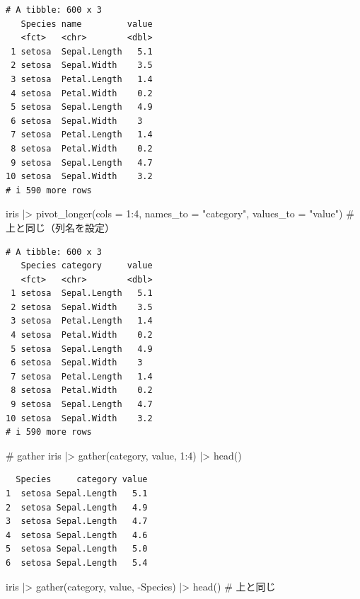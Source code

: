 \documentclass[
  letterpaper,
  DIV=11,
  numbers=noendperiod]{scrreprt}
\newenvironment{Shaded}{\begin{snugshade}}{\end{snugshade}}
\newcommand{\AttributeTok}[1]{\textcolor[rgb]{0.40,0.45,0.13}{#1}}
\newcommand{\CommentTok}[1]{\textcolor[rgb]{0.37,0.37,0.37}{#1}}
\newcommand{\DecValTok}[1]{\textcolor[rgb]{0.68,0.00,0.00}{#1}}
\newcommand{\FunctionTok}[1]{\textcolor[rgb]{0.28,0.35,0.67}{#1}}
\newcommand{\NormalTok}[1]{\textcolor[rgb]{0.00,0.23,0.31}{#1}}
\newcommand{\SpecialCharTok}[1]{\textcolor[rgb]{0.37,0.37,0.37}{#1}}
\newcommand{\StringTok}[1]{\textcolor[rgb]{0.13,0.47,0.30}{#1}}
\begin{document}
\begin{verbatim}
# A tibble: 600 x 3
   Species name         value
   <fct>   <chr>        <dbl>
 1 setosa  Sepal.Length   5.1
 2 setosa  Sepal.Width    3.5
 3 setosa  Petal.Length   1.4
 4 setosa  Petal.Width    0.2
 5 setosa  Sepal.Length   4.9
 6 setosa  Sepal.Width    3  
 7 setosa  Petal.Length   1.4
 8 setosa  Petal.Width    0.2
 9 setosa  Sepal.Length   4.7
10 setosa  Sepal.Width    3.2
# i 590 more rows
\end{verbatim}

\begin{Shaded}
\begin{Highlighting}[]
\NormalTok{iris }\SpecialCharTok{|\textgreater{}} \FunctionTok{pivot\_longer}\NormalTok{(}\AttributeTok{cols =} \DecValTok{1}\SpecialCharTok{:}\DecValTok{4}\NormalTok{, }\AttributeTok{names\_to =} \StringTok{"category"}\NormalTok{, }\AttributeTok{values\_to =} \StringTok{"value"}\NormalTok{) }\CommentTok{\# 上と同じ（列名を設定）}
\end{Highlighting}
\end{Shaded}

\begin{verbatim}
# A tibble: 600 x 3
   Species category     value
   <fct>   <chr>        <dbl>
 1 setosa  Sepal.Length   5.1
 2 setosa  Sepal.Width    3.5
 3 setosa  Petal.Length   1.4
 4 setosa  Petal.Width    0.2
 5 setosa  Sepal.Length   4.9
 6 setosa  Sepal.Width    3  
 7 setosa  Petal.Length   1.4
 8 setosa  Petal.Width    0.2
 9 setosa  Sepal.Length   4.7
10 setosa  Sepal.Width    3.2
# i 590 more rows
\end{verbatim}

\begin{Shaded}
\begin{Highlighting}[]
\CommentTok{\# gather}
\NormalTok{iris }\SpecialCharTok{|\textgreater{}} \FunctionTok{gather}\NormalTok{(category, value, }\DecValTok{1}\SpecialCharTok{:}\DecValTok{4}\NormalTok{) }\SpecialCharTok{|\textgreater{}} \FunctionTok{head}\NormalTok{()}
\end{Highlighting}
\end{Shaded}

\begin{verbatim}
  Species     category value
1  setosa Sepal.Length   5.1
2  setosa Sepal.Length   4.9
3  setosa Sepal.Length   4.7
4  setosa Sepal.Length   4.6
5  setosa Sepal.Length   5.0
6  setosa Sepal.Length   5.4
\end{verbatim}

\begin{Shaded}
\begin{Highlighting}[]
\NormalTok{iris }\SpecialCharTok{|\textgreater{}} \FunctionTok{gather}\NormalTok{(category, value, }\SpecialCharTok{{-}}\NormalTok{Species) }\SpecialCharTok{|\textgreater{}} \FunctionTok{head}\NormalTok{() }\CommentTok{\# 上と同じ}
\end{Highlighting}
\end{Shaded}
\end{document}

